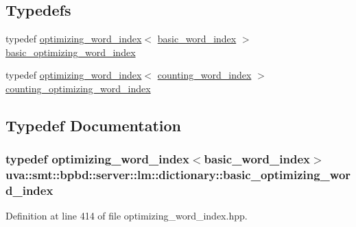 \subsection*{Typedefs}
\begin{DoxyCompactItemize}
\item 
typedef \hyperlink{classuva_1_1smt_1_1bpbd_1_1server_1_1lm_1_1dictionary_1_1optimizing__word__index}{optimizing\+\_\+word\+\_\+index}$<$ \hyperlink{classuva_1_1smt_1_1bpbd_1_1server_1_1lm_1_1dictionary_1_1basic__word__index}{basic\+\_\+word\+\_\+index} $>$ \hyperlink{namespaceuva_1_1smt_1_1bpbd_1_1server_1_1lm_1_1dictionary_a3001583c904eec702b4a4125082a7ecd}{basic\+\_\+optimizing\+\_\+word\+\_\+index}
\item 
typedef \hyperlink{classuva_1_1smt_1_1bpbd_1_1server_1_1lm_1_1dictionary_1_1optimizing__word__index}{optimizing\+\_\+word\+\_\+index}$<$ \hyperlink{classuva_1_1smt_1_1bpbd_1_1server_1_1lm_1_1dictionary_1_1counting__word__index}{counting\+\_\+word\+\_\+index} $>$ \hyperlink{namespaceuva_1_1smt_1_1bpbd_1_1server_1_1lm_1_1dictionary_a61cbd647b15de785ccf4cdd26661c366}{counting\+\_\+optimizing\+\_\+word\+\_\+index}
\end{DoxyCompactItemize}


\subsection{Typedef Documentation}
\hypertarget{namespaceuva_1_1smt_1_1bpbd_1_1server_1_1lm_1_1dictionary_a3001583c904eec702b4a4125082a7ecd}{}
\subsubsection[{basic\+\_\+optimizing\+\_\+word\+\_\+index}]{\setlength{\rightskip}{0pt plus 5cm}typedef {\bf optimizing\+\_\+word\+\_\+index}$<${\bf basic\+\_\+word\+\_\+index}$>$ {\bf uva\+::smt\+::bpbd\+::server\+::lm\+::dictionary\+::basic\+\_\+optimizing\+\_\+word\+\_\+index}}\label{namespaceuva_1_1smt_1_1bpbd_1_1server_1_1lm_1_1dictionary_a3001583c904eec702b4a4125082a7ecd}


Definition at line 414 of file optimizing\+\_\+word\+\_\+index.\+hpp.

